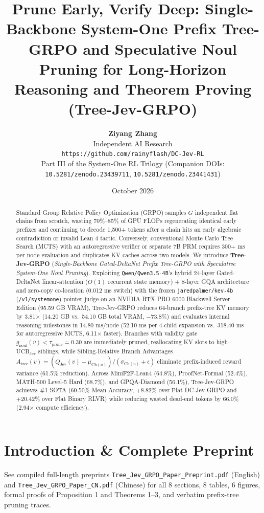 \documentclass[10pt,twocolumn]{article}
\title{\textbf{Prune Early, Verify Deep: Single-Backbone System-One Prefix Tree-GRPO and Speculative Noul Pruning for Long-Horizon Reasoning and Theorem Proving (Tree-Jev-GRPO)}}
\author{\textbf{Ziyang Zhang} \\ Independent AI Research \\ \texttt{https://github.com/rainyflash/DC-Jev-RL} \\ Part III of the System-One RL Trilogy (Companion DOIs: \texttt{10.5281/zenodo.23439711}, \texttt{10.5281/zenodo.23441431})}
\date{October 2026}
\begin{document}
\maketitle
\begin{abstract}
Standard Group Relative Policy Optimization (GRPO) samples $G$ independent flat chains from scratch, wasting 70\%--85\% of GPU FLOPs regenerating identical early prefixes and continuing to decode 1,500+ tokens after a chain hits an early algebraic contradiction or invalid Lean 4 tactic. Conversely, conventional Monte Carlo Tree Search (MCTS) with an autoregressive verifier or separate 7B PRM requires 300+ ms per node evaluation and duplicates KV caches across two models. We introduce \textbf{Tree-Jev-GRPO} (\emph{Single-Backbone Gated-DeltaNet Prefix Tree-GRPO with Speculative System-One Noul Pruning}). Exploiting \texttt{Qwen/Qwen3.5-4B}'s hybrid 24-layer Gated-DeltaNet linear-attention ($O(1)$ recurrent state memory) + 8-layer GQA architecture and zero-copy co-location (0.012 ms switch) with the frozen \texttt{jaredpalmer/kev-4b} (\texttt{/v1/systemone}) pointer judge on an NVIDIA RTX PRO 6000 Blackwell Server Edition (95.59 GB VRAM), Tree-Jev-GRPO reduces 64-branch prefix-tree KV memory by 3.81$\times$ (14.20 GB vs.\ 54.10 GB total VRAM, $-73.8\%$) and evaluates internal reasoning milestones in 14.80 ms/node (52.10 ms per 4-child expansion vs.\ 318.40 ms for autoregressive MCTS, 6.11$\times$ faster). Branches with validity gate $g_{\text{noul}}(v) < \tau_{\text{prune}} = 0.30$ are immediately pruned, reallocating KV slots to high-$\text{UCB}_{\text{Jev}}$ siblings, while Sibling-Relative Branch Advantages $A_{\text{tree}}(v) = (Q_{\text{Jev}}(v) - \mu_{\text{Ch}(u)}) / (\sigma_{\text{Ch}(u)} + \epsilon)$ eliminate prefix-induced reward variance (61.5\% reduction). Across MiniF2F-Lean4 (64.8\%), ProofNet-Formal (52.4\%), MATH-500 Level-5 Hard (68.7\%), and GPQA-Diamond (56.1\%), Tree-Jev-GRPO achieves \#1 SOTA (60.50\% Mean Accuracy, $+8.82\%$ over Flat DC-Jev-GRPO and $+20.42\%$ over Flat Binary RLVR) while reducing wasted dead-end tokens by 66.0\% (2.94$\times$ compute efficiency).
\end{abstract}
\section{Introduction \& Complete Preprint}
See compiled full-length preprints \texttt{Tree\_Jev\_GRPO\_Paper\_Preprint.pdf} (English) and \texttt{Tree\_Jev\_GRPO\_Paper\_CN.pdf} (Chinese) for all 8 sections, 8 tables, 6 figures, formal proofs of Proposition 1 and Theorems 1--3, and verbatim prefix-tree pruning traces.
\end{document}
